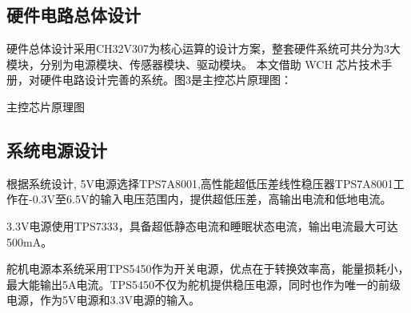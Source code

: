 \documentclass{article}%
\begin{document}
\begin{multicols}{2}
		\subsection{硬件电路总体设计}
		硬件总体设计采用CH32V307为核心运算的设计方案，整套硬件系统可共分为3大模块，分别为电源模块、传感器模块、驱动模块。
		本文借助 WCH 芯片技术手册，对硬件电路设计完善的系统。图3是主控芯片原理图：
		\begin{center}
			\caption{主控芯片原理图}		
		\end{center}		
		\subsection{系统电源设计}
		根据系统设计, 5V电源选择TPS7A8001,高性能超低压差线性稳压器TPS7A8001工作在-0.3V至6.5V的输入电压范围内，提供超低压差，高输出电流和低地电流。
		
		3.3V电源使用TPS7333，具备超低静态电流和睡眠状态电流，输出电流最大可达500mA。
		
		舵机电源本系统采用TPS5450作为开关电源，优点在于转换效率高，能量损耗小，最大能输出5A电流。TPS5450不仅为舵机提供稳压电源，同时也作为唯一的前级电源，作为5V电源和3.3V电源的输入。
		

\end{multicols}
\end{document}
